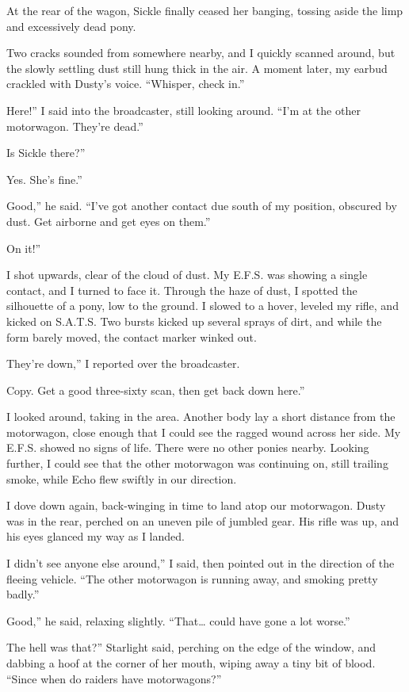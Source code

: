 At the rear of the wagon, Sickle finally ceased her banging, tossing aside the limp and excessively dead pony.

Two cracks sounded from somewhere nearby, and I quickly scanned around, but the slowly settling dust still hung thick in the air. A moment later, my earbud crackled with Dusty’s voice. “Whisper, check in.”

\leavevmode{}Here!” I said into the broadcaster, still looking around. “I’m at the other motorwagon. They’re dead.”

\leavevmode{}Is Sickle there?”

\leavevmode{}Yes. She’s fine.”

\leavevmode{}Good,” he said. “I’ve got another contact due south of my position, obscured by dust. Get airborne and get eyes on them.”

\leavevmode{}On it!”

I shot upwards, clear of the cloud of dust. My E.F.S. was showing a single contact, and I turned to face it. Through the haze of dust, I spotted the silhouette of a pony, low to the ground. I slowed to a hover, leveled my rifle, and kicked on S.A.T.S. Two bursts kicked up several sprays of dirt, and while the form barely moved, the contact marker winked out.

\leavevmode{}They’re down,” I reported over the broadcaster.

\leavevmode{}Copy. Get a good three-sixty scan, then get back down here.”

I looked around, taking in the area. Another body lay a short distance from the motorwagon, close enough that I could see the ragged wound across her side. My E.F.S. showed no signs of life. There were no other ponies nearby. Looking further, I could see that the other motorwagon was continuing on, still trailing smoke, while Echo flew swiftly in our direction.

I dove down again, back-winging in time to land atop our motorwagon. Dusty was in the rear, perched on an uneven pile of jumbled gear. His rifle was up, and his eyes glanced my way as I landed.

\leavevmode{}I didn’t see anyone else around,” I said, then pointed out in the direction of the fleeing vehicle. “The other motorwagon is running away, and smoking pretty badly.”

\leavevmode{}Good,” he said, relaxing slightly. “That… could have gone a lot worse.”

\leavevmode{}The hell was that?” Starlight said, perching on the edge of the window, and dabbing a hoof at the corner of her mouth, wiping away a tiny bit of blood. “Since when do raiders have motorwagons?”

